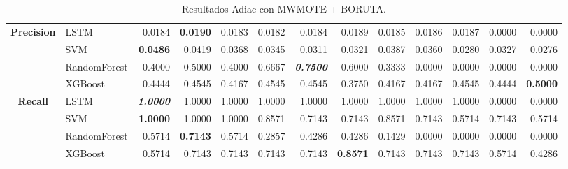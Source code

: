 \begin{table}[H]
\begin{adjustbox}{max width=14cm}
\begin{tabular}{|c|l|r|r|r|r|r|r|r|r|r|r|r|}
			\hline
			\textbf{Precision} &  LSTM &  0.0184 & \textbf{  0.0190 } &  0.0183 &  0.0182 &  0.0184 &  0.0189 &  0.0185 &  0.0186 &  0.0187 &  0.0000 &  0.0000 \\
			&  SVM & \textbf{  0.0486 } &  0.0419 &  0.0368 &  0.0345 &  0.0311 &  0.0321 &  0.0387 &  0.0360 &  0.0280 &  0.0327 &  0.0276 \\
			&  RandomForest &  0.4000 &  0.5000 &  0.4000 &  0.6667 & \textit{ \textbf{  0.7500 } } &  0.6000 &  0.3333 &  0.0000 &  0.0000 &  0.0000 &  0.0000 \\
			&  XGBoost &  0.4444 &  0.4545 &  0.4167 &  0.4545 &  0.4545 &  0.3750 &  0.4167 &  0.4167 &  0.4545 &  0.4444 & \textbf{  0.5000 } \\
			\hline
			\textbf{Recall} &  LSTM & \textit{ \textbf{  1.0000 } } &  1.0000 &  1.0000 &  1.0000 &  1.0000 &  1.0000 &  1.0000 &  1.0000 &  1.0000 &  0.0000 &  0.0000 \\
			&  SVM & \textbf{  1.0000 } &  1.0000 &  1.0000 &  0.8571 &  0.7143 &  0.7143 &  0.8571 &  0.7143 &  0.5714 &  0.7143 &  0.5714 \\
			&  RandomForest &  0.5714 & \textbf{  0.7143 } &  0.5714 &  0.2857 &  0.4286 &  0.4286 &  0.1429 &  0.0000 &  0.0000 &  0.0000 &  0.0000 \\
			&  XGBoost &  0.5714 &  0.7143 &  0.7143 &  0.7143 &  0.7143 & \textbf{  0.8571 } &  0.7143 &  0.7143 &  0.7143 &  0.5714 &  0.4286 \\
			\hline
		\end{tabular}
	\end{adjustbox}
	\caption{Resultados Adiac con MWMOTE + BORUTA.}
	\label{tab:Adiac_MWMOTE_BORUTA}
\end{table}

